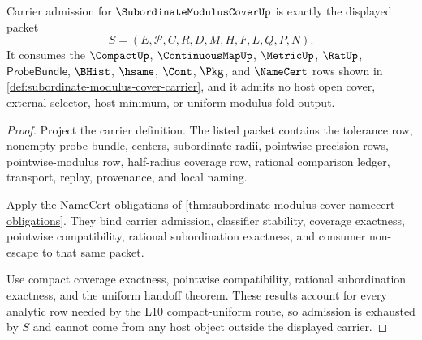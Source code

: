 \begin{theorem}
\label{thm:subordinate-modulus-cover-carrier-admission}
Carrier admission for $\SubordinateModulusCoverUp$ is exactly the displayed packet
$$
S=(E,\mathcal{P},C,R,D,M,H,F,L,Q,P,N).
$$
It consumes the $\CompactUp$, $\ContinuousMapUp$, $\MetricUp$, $\RatUp$, $\mathsf{ProbeBundle}$, $\BHist$, $\hsame$, $\Cont$, $\Pkg$, and $\NameCert$ rows shown in \autoref{def:subordinate-modulus-cover-carrier}, and it admits no host open cover, external selector, host minimum, or uniform-modulus fold output.
\end{theorem}
\begin{proof}
Project the carrier definition. The listed packet contains the tolerance row, nonempty probe bundle, centers, subordinate radii, pointwise precision rows, pointwise-modulus row, half-radius coverage row, rational comparison ledger, transport, replay, provenance, and local naming.

Apply the NameCert obligations of \autoref{thm:subordinate-modulus-cover-namecert-obligations}. They bind carrier admission, classifier stability, coverage exactness, pointwise compatibility, rational subordination exactness, and consumer non-escape to that same packet.

Use compact coverage exactness, pointwise compatibility, rational subordination exactness, and the uniform handoff theorem. These results account for every analytic row needed by the L10 compact-uniform route, so admission is exhausted by $S$ and cannot come from any host object outside the displayed carrier.
\end{proof}

